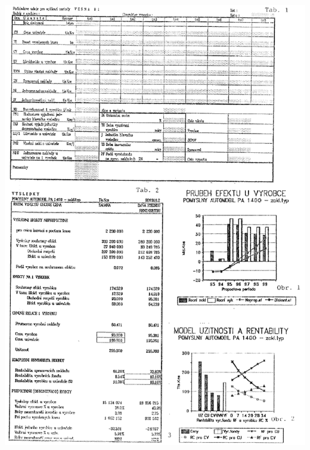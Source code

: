 \documentclass [10pt, fancyhdr, twoside] {article}
\begin{document}
\newpage

\includegraphics[width=\textwidth,height=\textheight,keepaspectratio]{./vesna-obr1.png}

\newpage
\end{document}
